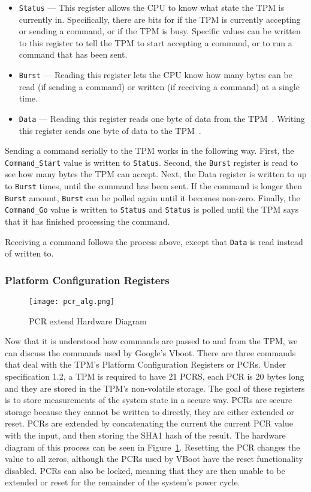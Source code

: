 \documentclass[../report.tex]{subfiles}
\def\code#1{\texttt{#1}}
\begin{document}
\begin{itemize}
    \item \code{Status} --- This register allows the CPU to know what state the TPM is currently in. Specifically, there are bits for  if the TPM is currently accepting or sending a command, or if the TPM is busy. Specific values can be written to this register to tell the TPM to start accepting a command, or to run a command that has been sent.
    \item \code{Burst} --- Reading this register lets the CPU know how many bytes can be read (if sending a command) or written (if receiving a command) at a single time.
    \item \code{Data} --- Reading this register reads one byte of data from the TPM~. Writing this register sends one byte of data to the TPM~.
\end{itemize}

Sending a command serially to the TPM works in the following way.
First, the \code{Command\_Start} value is written to \code{Status}.
Second, the \code{Burst} register is read to see how many bytes the TPM can accept.
Next, the Data register is written to up to \code{Burst} times, until the command has been sent.
If the command is longer then \code{Burst} amount, \code{Burst} can be polled again until it becomes non-zero.
Finally, the \code{Command\_Go} value is written to \code{Status} and \code{Status} is polled until the TPM says that it has finished processing the command.

Receiving a command follows the process above, except that \code{Data} is read instead of written to.

\subsubsection{Platform Configuration Registers}

\begin{figure}
  \centering
  \texttt{[image: pcr\_alg.png]}
  \caption{PCR extend Hardware Diagram}
  \label{fig:pcr_alg}
\end{figure}

Now that it is understood how commands are passed to and from the TPM, we can discuss the commands used by Google's Vboot.
There are three commands that deal with the TPM's Platform Configuration Registers or PCRs.
Under specification 1.2, a TPM is required to have 21 PCRS, each PCR is 20 bytes long and they are stored in the TPM's non-volatile storage.
The goal of these registers is to store measurements of the system state in a secure way. 
PCRs are secure storage because they cannot be written to directly, they are either extended or reset. 
PCRs are extended by concatenating the current the current PCR value with the input, and then storing the SHA1 hash of the result. 
The hardware diagram of this process can be seen in Figure~\ref{fig:pcr_alg}.
Resetting the PCR changes the value to all zeros, although the PCRs used by VBoot have the reset functionality disabled.
PCRs can also be locked, meaning that they are then unable to be extended or reset for the remainder of the system's power cycle.
\end{document}

